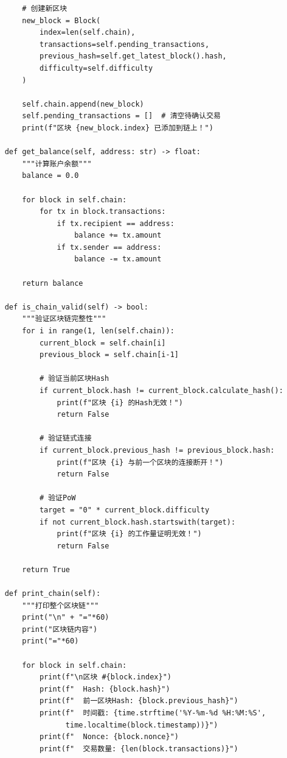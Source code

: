 ﻿\documentclass[12pt,a4paper]{article}
\begin{document}
\begin{lstlisting}
        # 创建新区块
        new_block = Block(
            index=len(self.chain),
            transactions=self.pending_transactions,
            previous_hash=self.get_latest_block().hash,
            difficulty=self.difficulty
        )
        
        self.chain.append(new_block)
        self.pending_transactions = []  # 清空待确认交易
        print(f"区块 {new_block.index} 已添加到链上！")
    
    def get_balance(self, address: str) -> float:
        """计算账户余额"""
        balance = 0.0
        
        for block in self.chain:
            for tx in block.transactions:
                if tx.recipient == address:
                    balance += tx.amount
                if tx.sender == address:
                    balance -= tx.amount
        
        return balance
    
    def is_chain_valid(self) -> bool:
        """验证区块链完整性"""
        for i in range(1, len(self.chain)):
            current_block = self.chain[i]
            previous_block = self.chain[i-1]
            
            # 验证当前区块Hash
            if current_block.hash != current_block.calculate_hash():
                print(f"区块 {i} 的Hash无效！")
                return False
            
            # 验证链式连接
            if current_block.previous_hash != previous_block.hash:
                print(f"区块 {i} 与前一个区块的连接断开！")
                return False
            
            # 验证PoW
            target = "0" * current_block.difficulty
            if not current_block.hash.startswith(target):
                print(f"区块 {i} 的工作量证明无效！")
                return False
        
        return True
    
    def print_chain(self):
        """打印整个区块链"""
        print("\n" + "="*60)
        print("区块链内容")
        print("="*60)
        
        for block in self.chain:
            print(f"\n区块 #{block.index}")
            print(f"  Hash: {block.hash}")
            print(f"  前一区块Hash: {block.previous_hash}")
            print(f"  时间戳: {time.strftime('%Y-%m-%d %H:%M:%S', 
                  time.localtime(block.timestamp))}")
            print(f"  Nonce: {block.nonce}")
            print(f"  交易数量: {len(block.transactions)}")
            

\end{lstlisting}
\end{document}

